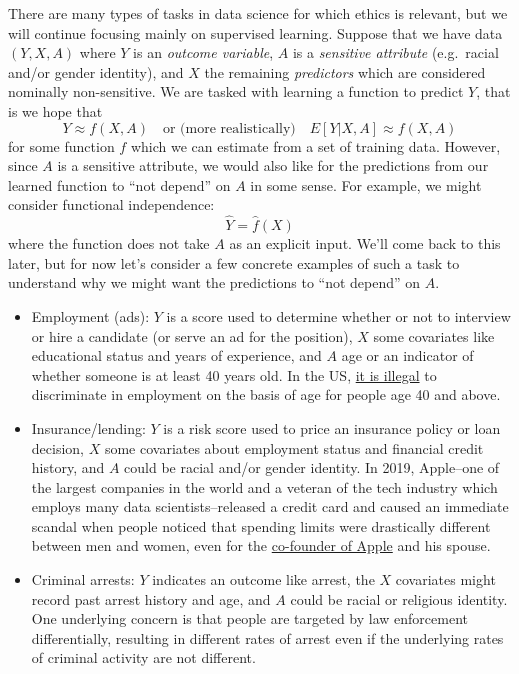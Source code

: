 \documentclass[]{book}
\providecommand{\tightlist}{%
  \setlength{\itemsep}{0pt}\setlength{\parskip}{0pt}}
\theoremstyle{definition}
\theoremstyle{definition}
\theoremstyle{definition}
\theoremstyle{remark}
\begin{document}
There are many types of tasks in data science for which ethics is
relevant, but we will continue focusing mainly on supervised learning.
Suppose that we have data \((Y, X, A)\) where \(Y\) is an \emph{outcome
variable}, \(A\) is a \emph{sensitive attribute} (e.g.~racial and/or
gender identity), and \(X\) the remaining \emph{predictors} which are
considered nominally non-sensitive. We are tasked with learning a
function to predict \(Y\), that is we hope that \[
Y \approx f(X, A) \quad \text{or (more realistically)} \quad E[Y|X, A] \approx f(X, A)
\] for some function \(f\) which we can estimate from a set of training
data. However, since \(A\) is a sensitive attribute, we would also like
for the predictions from our learned function to ``not depend'' on \(A\)
in some sense. For example, we might consider functional independence:
\[
\hat Y = \hat f(X)
\] where the function does not take \(A\) as an explicit input. We'll
come back to this later, but for now let's consider a few concrete
examples of such a task to understand why we might want the predictions
to ``not depend'' on \(A\).

\begin{itemize}
\tightlist
\item
  Employment (ads): \(Y\) is a score used to determine whether or not to
  interview or hire a candidate (or serve an ad for the position), \(X\)
  some covariates like educational status and years of experience, and
  \(A\) age or an indicator of whether someone is at least 40 years old.
  In the US,
  \href{https://en.wikipedia.org/wiki/Age_Discrimination_in_Employment_Act_of_1967}{it
  is illegal} to discriminate in employment on the basis of age for
  people age 40 and above.
\item
  Insurance/lending: \(Y\) is a risk score used to price an insurance
  policy or loan decision, \(X\) some covariates about employment status
  and financial credit history, and \(A\) could be racial and/or gender
  identity. In 2019, Apple--one of the largest companies in the world
  and a veteran of the tech industry which employs many data
  scientists--released a credit card and caused an immediate scandal
  when people noticed that spending limits were drastically different
  between men and women, even for the
  \href{https://www.wired.com/story/the-apple-card-didnt-see-genderand-thats-the-problem/}{co-founder
  of Apple} and his spouse.
\item
  Criminal arrests: \(Y\) indicates an outcome like arrest, the \(X\)
  covariates might record past arrest history and age, and \(A\) could
  be racial or religious identity. One underlying concern is that people
  are targeted by law enforcement differentially, resulting in different
  rates of arrest even if the underlying rates of criminal activity are
  not different.
\end{itemize}
\end{document}
